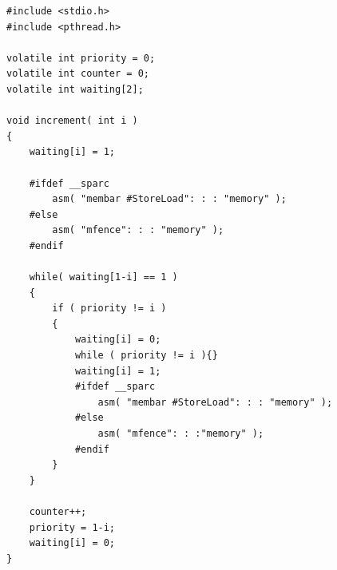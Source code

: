 \documentclass[12pt,a4paper]{report}
\begin{document}
\begin{lstlisting}
#include <stdio.h>
#include <pthread.h>

volatile int priority = 0;
volatile int counter = 0;
volatile int waiting[2];

void increment( int i )
{
	waiting[i] = 1;

	#ifdef __sparc
		asm( "membar #StoreLoad": : : "memory" );
	#else
		asm( "mfence": : : "memory" );
	#endif
	
	while( waiting[1-i] == 1 )
	{
		if ( priority != i )
		{
			waiting[i] = 0;
			while ( priority != i ){}
			waiting[i] = 1;
			#ifdef __sparc
				asm( "membar #StoreLoad": : : "memory" );
			#else
				asm( "mfence": : :"memory" );
			#endif
		}
	}

	counter++;
	priority = 1-i;
	waiting[i] = 0;
}
\end{lstlisting}
\end{document}
